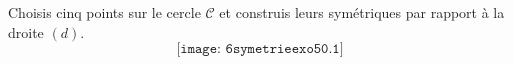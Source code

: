   Choisis cinq points sur le cercle $\mathscr C$ et construis leurs
  symétriques par rapport à la droite $(d)$.
  \[\texttt{[image: 6symetrieexo50.1]}\]